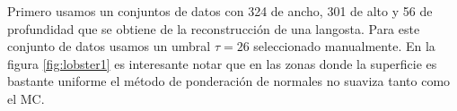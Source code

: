 



Primero usamos un conjuntos de datos con 324 de ancho, 301 de alto y 56 de profundidad que se obtiene de la reconstrucción de una langosta. Para este conjunto de datos usamos un umbral $\tau = 26$ seleccionado manualmente. En la figura \ref{fig:lobster1} es interesante notar que en las zonas donde la superficie es bastante uniforme el método de ponderación de normales no suaviza tanto como el MC.

